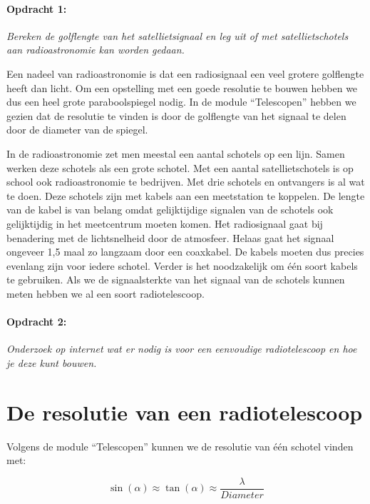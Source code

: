 \paragraph*{Opdracht 1:}

\emph{Bereken de golflengte van het satellietsignaal en leg uit of
met satellietschotels aan radioastronomie kan worden gedaan.}

Een nadeel van radioastronomie is dat een radiosignaal een veel grotere
golflengte heeft dan licht. Om een opstelling met een goede resolutie
te bouwen hebben we dus een heel grote paraboolspiegel nodig. In de
module ``Telescopen'' hebben we gezien dat de resolutie te vinden
is door de golflengte van het signaal te delen door de diameter van
de spiegel.

In de radioastronomie zet men meestal een aantal schotels op een lijn.
Samen werken deze schotels als een grote schotel. Met een aantal satellietschotels
is op school ook radioastronomie te bedrijven. Met drie schotels en
ontvangers is al wat te doen. Deze schotels zijn met kabels aan een
meetstation te koppelen. De lengte van de kabel is van belang omdat
gelijktijdige signalen van de schotels ook gelijktijdig in het meetcentrum
moeten komen. Het radiosignaal gaat bij benadering met de lichtsnelheid
door de atmosfeer. Helaas gaat het signaal ongeveer 1,5 maal zo langzaam
door een coaxkabel. De kabels moeten dus precies evenlang zijn voor
iedere schotel. Verder is het noodzakelijk om één soort kabels te
gebruiken. Als we de signaalsterkte van het signaal van de schotels
kunnen meten hebben we al een soort radiotelescoop.


\paragraph*{Opdracht 2:}

\emph{Onderzoek op internet wat er nodig is voor een eenvoudige radiotelescoop
en hoe je deze kunt bouwen.}


\section{De resolutie van een radiotelescoop}

Volgens de module ``Telescopen'' kunnen we de resolutie van één
schotel vinden met:

\begin{equation}
\sin(\alpha)\approx \tan(\alpha)\approx\frac{\lambda}{Diameter}
\end{equation}


